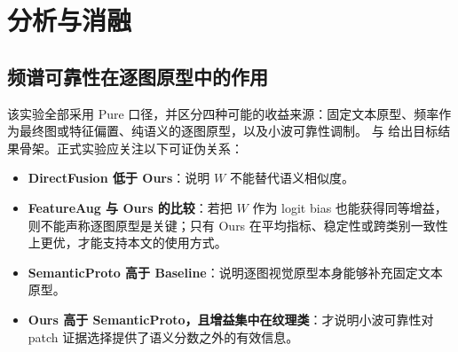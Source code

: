 \section{分析与消融}
\label{sec:analysis}

\subsection{频谱可靠性在逐图原型中的作用}
该实验全部采用 Pure 口径，并区分四种可能的收益来源：固定文本原型、频率作为最终图或特征偏置、纯语义的逐图原型，以及小波可靠性调制。 与  给出目标结果骨架。正式实验应关注以下可证伪关系：
\begin{itemize}[leftmargin=1.4em,itemsep=0.1em,topsep=0.2em]
\item \textbf{DirectFusion 低于 Ours}：说明 $W$ 不能替代语义相似度。
\item \textbf{FeatureAug 与 Ours 的比较}：若把 $W$ 作为 logit bias 也能获得同等增益，则不能声称逐图原型是关键；只有 Ours 在平均指标、稳定性或跨类别一致性上更优，才能支持本文的使用方式。
\item \textbf{SemanticProto 高于 Baseline}：说明逐图视觉原型本身能够补充固定文本原型。
\item \textbf{Ours 高于 SemanticProto，且增益集中在纹理类}：才说明小波可靠性对 patch 证据选择提供了语义分数之外的有效信息。
\end{itemize}

\begin{table}[t]
\centering
\caption{核心机制消融骨架（MVTec / VisA，全指标）。数值为预期目标。}
\label{tab:ablation}
\small
\setlength{\tabcolsep}{4pt}
\end{table}


